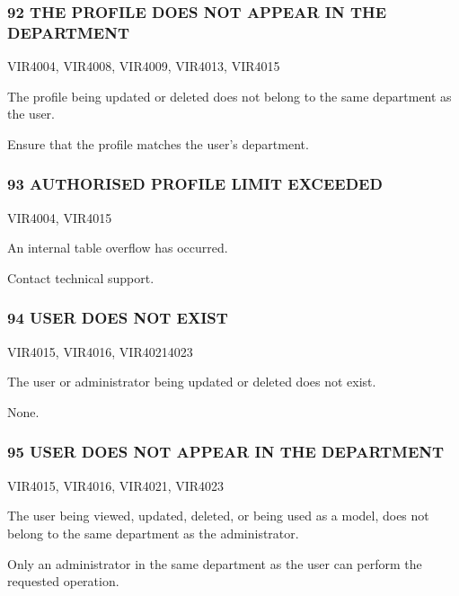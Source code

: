 \documentclass[letterpaper,10pt,english]{sphinxmanual}
\begin{document}
\subsubsection{92 THE PROFILE DOES NOT APPEAR IN THE DEPARTMENT}
\label{\detokenize{messages:the-profile-does-not-appear-in-the-department}}\begin{description}
\sphinxAtStartPar
VIR4004, VIR4008, VIR4009, VIR4013, VIR4015

\sphinxAtStartPar
The profile being updated or deleted does not belong to the same department as the user.

\sphinxAtStartPar
Ensure that the profile matches the user’s department.

\end{description}


\subsubsection{93 AUTHORISED PROFILE LIMIT EXCEEDED}
\label{\detokenize{messages:authorised-profile-limit-exceeded}}\begin{description}
\sphinxAtStartPar
VIR4004, VIR4015

\sphinxAtStartPar
An internal table overflow has occurred.

\sphinxAtStartPar
Contact technical support.

\end{description}


\subsubsection{94 USER DOES NOT EXIST}
\label{\detokenize{messages:user-does-not-exist}}\begin{description}
\sphinxAtStartPar
VIR4015, VIR4016, VIR4021\sphinxhyphen{}4023

\sphinxAtStartPar
The user or administrator being updated or deleted does not exist.

\sphinxAtStartPar
None.

\end{description}


\subsubsection{95 USER DOES NOT APPEAR IN THE DEPARTMENT}
\label{\detokenize{messages:user-does-not-appear-in-the-department}}\begin{description}
\sphinxAtStartPar
VIR4015, VIR4016, VIR4021, VIR4023

\sphinxAtStartPar
The user being viewed, updated, deleted, or being used as a model, does not belong to the same department as the administrator.

\sphinxAtStartPar
Only an administrator in the same department as the user can perform the requested operation.

\end{description}
\end{document}

